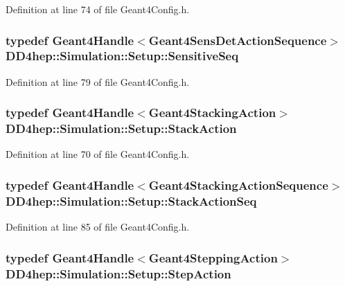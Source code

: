 Definition at line 74 of file Geant4Config.h.\hypertarget{namespace_d_d4hep_1_1_simulation_1_1_setup_a92085f8dfd1adaa9d05d5aeeeb9380b2}{
\subsubsection[{SensitiveSeq}]{\setlength{\rightskip}{0pt plus 5cm}typedef {\bf Geant4Handle}$<${\bf Geant4SensDetActionSequence}$>$ {\bf DD4hep::Simulation::Setup::SensitiveSeq}}}
\label{namespace_d_d4hep_1_1_simulation_1_1_setup_a92085f8dfd1adaa9d05d5aeeeb9380b2}


Definition at line 79 of file Geant4Config.h.\hypertarget{namespace_d_d4hep_1_1_simulation_1_1_setup_a2656383b49e01ac46b211b6f30d17d5a}{
\subsubsection[{StackAction}]{\setlength{\rightskip}{0pt plus 5cm}typedef {\bf Geant4Handle}$<${\bf Geant4StackingAction}$>$ {\bf DD4hep::Simulation::Setup::StackAction}}}
\label{namespace_d_d4hep_1_1_simulation_1_1_setup_a2656383b49e01ac46b211b6f30d17d5a}


Definition at line 70 of file Geant4Config.h.\hypertarget{namespace_d_d4hep_1_1_simulation_1_1_setup_a4b1936ec223ba4447955c468db61490f}{
\subsubsection[{StackActionSeq}]{\setlength{\rightskip}{0pt plus 5cm}typedef {\bf Geant4Handle}$<${\bf Geant4StackingActionSequence}$>$ {\bf DD4hep::Simulation::Setup::StackActionSeq}}}
\label{namespace_d_d4hep_1_1_simulation_1_1_setup_a4b1936ec223ba4447955c468db61490f}


Definition at line 85 of file Geant4Config.h.\hypertarget{namespace_d_d4hep_1_1_simulation_1_1_setup_a8a860273aa78bb79db7b588476284a99}{
\subsubsection[{StepAction}]{\setlength{\rightskip}{0pt plus 5cm}typedef {\bf Geant4Handle}$<${\bf Geant4SteppingAction}$>$ {\bf DD4hep::Simulation::Setup::StepAction}}}
\label{namespace_d_d4hep_1_1_simulation_1_1_setup_a8a860273aa78bb79db7b588476284a99}



